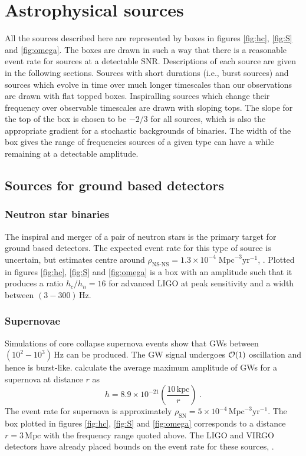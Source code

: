 \section{Astrophysical sources}\label{sec:sources}
All the sources described here are represented by boxes in figures \ref{fig:hc}, \ref{fig:S} and \ref{fig:omega}. The boxes are drawn in such a way that there is a reasonable event rate for sources at a detectable SNR. Descriptions of each source are given in the following sections. Sources with short durations (i.e., burst sources) and sources which evolve in time over much longer timescales than our observations are drawn with flat topped boxes. Inspiralling sources which change their frequency over observable timescales are drawn with sloping tops. The slope for the top of the box is chosen to be $-2/3$ for all sources, which is also the appropriate gradient for a stochastic backgrounds of binaries. The width of the box gives the range of frequencies sources of a given type can have a while remaining at a detectable amplitude.




\subsection{Sources for ground based detectors}

\subsubsection{Neutron star binaries}
The inspiral and merger of a pair of neutron stars is the primary target for ground based detectors. The expected event rate for this type of source is uncertain, but estimates centre around $\rho_{\textrm{NS-NS}}=1.3\times 10^{-4}\;\textrm{Mpc}^{-3}\textrm{yr}^{-1}$, \cite{CBC}. Plotted in figures \ref{fig:hc}, \ref{fig:S} and \ref{fig:omega} is a box with an amplitude such that it produces a ratio $h_{c}/h_{n}=16$ for advanced LIGO at peak sensitivity and a width between $(3-300)\,\textrm{Hz}$.

\subsubsection{Supernovae}
Simulations of core collapse supernova events show that GWs between $(10^{2}-10^{3})\,\textrm{Hz}$ can be produced. The GW signal undergoes ${\cal{O}}(1)$ oscillation and hence is burst-like. \cite{2002A&A...393..523D} calculate the average maximum amplitude of GWs for a supernova at distance $r$ as
\begin{equation} h=8.9\times 10^{-21}\left( \frac{10 \,\textrm{kpc}}{r} \right) \; .\end{equation}
The event rate for supernova is approximately $\rho_{\textrm{SN}}=5\times10^{-4}\,\textrm{Mpc}^{-3}\textrm{yr}^{-1}$. The box plotted in figures \ref{fig:hc}, \ref{fig:S} and \ref{fig:omega} corresponds to a distance $r=3 \,\textrm{Mpc}$ with the frequency range quoted above. The LIGO and VIRGO detectors have already placed bounds on the event rate for these sources, \cite{Bursts}.

